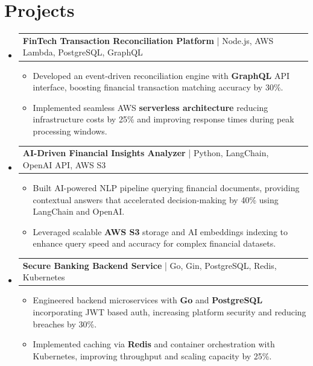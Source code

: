 \documentclass[letterpaper,11pt]{article}
\makeatletter
\newcommand{\resumeItem}[1]{
  \item\footnotesize{
    {#1 \vspace{-2pt}}
  }
}
\newcommand{\resumeProjectHeading}[2]{
    \item
    \begin{tabular*}{1.001\textwidth}{l@{\extracolsep{\fill}}r}
      \small#1 & \textbf{\small #2}\\
    \end{tabular*}\vspace{-7pt}
}
\newcommand{\resumeSubHeadingListStart}{\begin{itemize}[leftmargin=0pt, label={}]}
\newcommand{\resumeSubHeadingListEnd}{\end{itemize}}
\newcommand{\resumeItemListStart}{\begin{itemize}[leftmargin=*]}
\newcommand{\resumeItemListEnd}{\end{itemize}\vspace{-5pt}}
\makeatother
\begin{document}
\section{Projects}
    \vspace{-5pt}
    \resumeSubHeadingListStart

      \resumeProjectHeading
          {\textbf{FinTech Transaction Reconciliation Platform} | Node.js, AWS Lambda, PostgreSQL, GraphQL}{ }
        \resumeItemListStart
            \resumeItem{Developed an event-driven reconciliation engine with \textbf{GraphQL} API interface, boosting financial transaction matching accuracy by 30\%.}
            \resumeItem{Implemented seamless AWS \textbf{serverless architecture} reducing infrastructure costs by 25\% and improving response times during peak processing windows.}
        \resumeItemListEnd
        \vspace{-12pt}

      \resumeProjectHeading
          {\textbf{AI-Driven Financial Insights Analyzer} | Python, LangChain, OpenAI API, AWS S3}{ }
        \resumeItemListStart
            \resumeItem{Built AI-powered NLP pipeline querying financial documents, providing contextual answers that accelerated decision-making by 40\% using LangChain and OpenAI.}
            \resumeItem{Leveraged scalable \textbf{AWS S3} storage and AI embeddings indexing to enhance query speed and accuracy for complex financial datasets.}
        \resumeItemListEnd
        \vspace{-12pt}

      \resumeProjectHeading
          {\textbf{Secure Banking Backend Service} | Go, Gin, PostgreSQL, Redis, Kubernetes}{ }
        \resumeItemListStart
            \resumeItem{Engineered backend microservices with \textbf{Go} and \textbf{PostgreSQL} incorporating JWT based auth, increasing platform security and reducing breaches by 30\%.}
            \resumeItem{Implemented caching via \textbf{Redis} and container orchestration with Kubernetes, improving throughput and scaling capacity by 25\%.}
        \resumeItemListEnd

    \resumeSubHeadingListEnd
\end{document}

